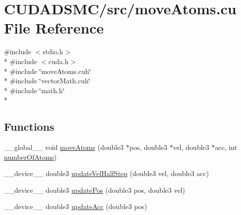 \hypertarget{move_atoms_8cu}{\section{C\+U\+D\+A\+D\+S\+M\+C/src/move\+Atoms.cu File Reference}
\label{move_atoms_8cu}
}
{\ttfamily \#include $<$stdio.\+h$>$}\\*
{\ttfamily \#include $<$cuda.\+h$>$}\\*
{\ttfamily \#include \char`\"{}move\+Atoms.\+cuh\char`\"{}}\\*
{\ttfamily \#include \char`\"{}vector\+Math.\+cuh\char`\"{}}\\*
{\ttfamily \#include \char`\"{}math.\+h\char`\"{}}\\*
\subsection*{Functions}
\begin{DoxyCompactItemize}
\item 
\+\_\+\+\_\+global\+\_\+\+\_\+ void \hyperlink{move_atoms_8cu_ad773cb3a8b3c26ec2feadda563a7d272}{move\+Atoms} (double3 $\ast$pos, double3 $\ast$vel, double3 $\ast$acc, int \hyperlink{initial_system_parameters_8cuh_a5ce690e43012981ef3034cbf0c746489}{number\+Of\+Atoms})
\item 
\+\_\+\+\_\+device\+\_\+\+\_\+ double3 \hyperlink{move_atoms_8cu_aebf2f5bae0865bdce93e42043725a589}{update\+Vel\+Half\+Step} (double3 vel, double3 acc)
\item 
\+\_\+\+\_\+device\+\_\+\+\_\+ double3 \hyperlink{move_atoms_8cu_a6fc01de03412c50d8220d2c617847179}{update\+Pos} (double3 pos, double3 vel)
\item 
\+\_\+\+\_\+device\+\_\+\+\_\+ double3 \hyperlink{move_atoms_8cu_aab55560bb96302129a94cfa7584b2256}{update\+Acc} (double3 pos)
\end{DoxyCompactItemize}
